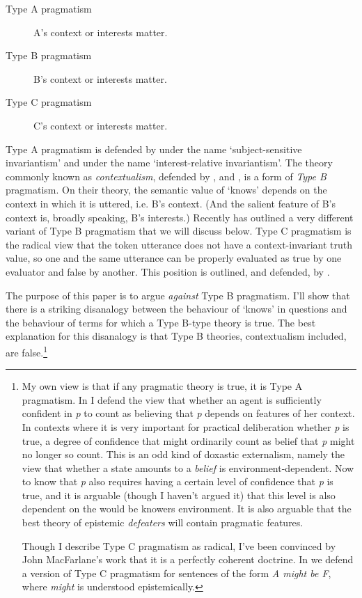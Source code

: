 \begin{description}
\item[Type A pragmatism] A's context or interests matter.
\item[Type B pragmatism] B's context or interests matter.
\item[Type C pragmatism] C's context or interests matter.
\end{description}

\noindent Type A pragmatism is defended by \citet{Hawthorne2004} under the name `subject\hyp{}sensitive invariantism' and \citet{Stanley2005-STAKAP} under the name `interest-relative invariantism'. The theory commonly known as \textit{contextualism}, defended by \citet{Cohen1986}, \citet{DeRose1995} and \citet{Lewis1996b}, is a form of \textit{Type B} pragmatism. On their theory, the semantic value of `knows' depends on the context in which it is uttered, i.e. B's context. (And the salient feature of B's context is, broadly speaking, B's interests.) Recently \citet{MacFarlane2009-MACNC} has outlined a very different variant of Type B pragmatism that we will discuss below. Type C pragmatism is the radical view that the token utterance does not have a context-invariant truth value, so one and the same utterance can be properly evaluated as true by one evaluator and false by another. This position is outlined, and defended, by \citet{MacFarlane2005-Knowledge}.

The purpose of this paper is to argue \textit{against} Type B pragmatism. I'll show that there is a striking disanalogy between the behaviour of `knows' in questions and the behaviour of terms for which a Type B-type theory is true. The best explanation for this disanalogy is that Type B theories, contextualism included, are false.\footnote{My own view is that if any pragmatic theory is true, it is Type A pragmatism. In \citet{Weatherson2005-WEACWD} I defend the view that whether an agent is sufficiently confident in \textit{p} to count as believing that \textit{p} depends on features of her context. In contexts where it is very important for practical deliberation whether \textit{p} is true, a degree of confidence that might ordinarily count as belief that \textit{p} might no longer so count. This is an odd kind of doxastic externalism, namely the view that whether a state amounts to a \textit{belief} is environment-dependent. Now to know that \textit{p} also requires having a certain level of confidence that \textit{p} is true, and it is arguable (though I haven't argued it) that this level is also dependent on the would be knowers environment. It is also arguable that the best theory of epistemic \textit{defeaters} will contain pragmatic features.\par Though I describe Type C pragmatism as radical, I've been convinced by John MacFarlane's work that it is a perfectly coherent doctrine. In \citet{Egan2005-EGAEMI} we defend a version of Type C pragmatism for sentences of the form \textit{A might be F}, where \textit{might} is understood epistemically. }

